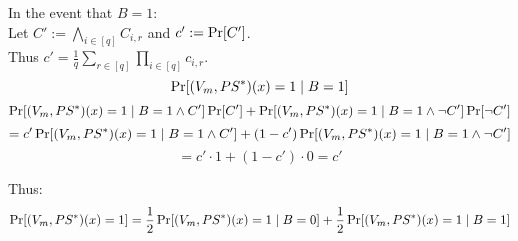 \begin{itemize}
		In the event that $B=1$:\\
		Let $C':=\bigwedge_{i\in[q]}C_{i,r}$ and $c':=\operatorname*{Pr}[C']$.\\
		Thus $c'=\frac{1}{q}\sum_{r\in[q]}\prod_{i\in[q]}c_{i,r}$.\\
		\[
			\operatorname*{Pr}[(V_m,PS^*)(x)=1\mid B=1]
		\]
		\[
			\operatorname*{Pr}[(V_m,PS^*)(x)=1\mid B=1\wedge C']\operatorname*{Pr}[C']
			+\operatorname*{Pr}[(V_m,PS^*)(x)=1\mid B=1\wedge \neg C']\operatorname*{Pr}[\neg C']
		\]
		\[
			=c'\operatorname*{Pr}[(V_m,PS^*)(x)=1\mid B=1\wedge C']
			+(1-c')\operatorname*{Pr}[(V_m,PS^*)(x)=1\mid B=1\wedge \neg C']
		\]
		\[
			=c'\cdot 1+(1-c')\cdot 0=c'
		\]

		Thus:
		\[
			\operatorname*{Pr}[(V_m,PS^*)(x)=1]
			=\frac{1}{2}\operatorname*{Pr}[(V_m,PS^*)(x)=1\mid B=0]+\frac{1}{2}\operatorname*{Pr}[(V_m,PS^*)(x)=1\mid B=1]
		\]
\end{itemize}